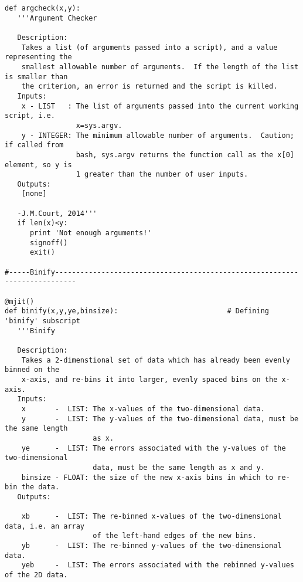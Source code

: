 \begin{verbatim}
def argcheck(x,y):
   '''Argument Checker

   Description:
    Takes a list (of arguments passed into a script), and a value representing the
    smallest allowable number of arguments.  If the length of the list is smaller than
    the criterion, an error is returned and the script is killed.
   Inputs:
    x - LIST   : The list of arguments passed into the current working script, i.e.
                 x=sys.argv.
    y - INTEGER: The minimum allowable number of arguments.  Caution; if called from
                 bash, sys.argv returns the function call as the x[0] element, so y is
                 1 greater than the number of user inputs.
   Outputs:
    [none]

   -J.M.Court, 2014'''
   if len(x)<y:
      print 'Not enough arguments!'
      signoff()
      exit()

#-----Binify---------------------------------------------------------------------------

@mjit()
def binify(x,y,ye,binsize):                          # Defining 'binify' subscript
   '''Binify

   Description:
    Takes a 2-dimenstional set of data which has already been evenly binned on the
    x-axis, and re-bins it into larger, evenly spaced bins on the x-axis.
   Inputs:
    x       -  LIST: The x-values of the two-dimensional data.
    y       -  LIST: The y-values of the two-dimensional data, must be the same length
                     as x.
    ye      -  LIST: The errors associated with the y-values of the two-dimensional
                     data, must be the same length as x and y.
    binsize - FLOAT: the size of the new x-axis bins in which to re-bin the data.
   Outputs:

    xb      -  LIST: The re-binned x-values of the two-dimensional data, i.e. an array
                     of the left-hand edges of the new bins.
    yb      -  LIST: The re-binned y-values of the two-dimensional data.
    yeb     -  LIST: The errors associated with the rebinned y-values of the 2D data.


\end{verbatim}

